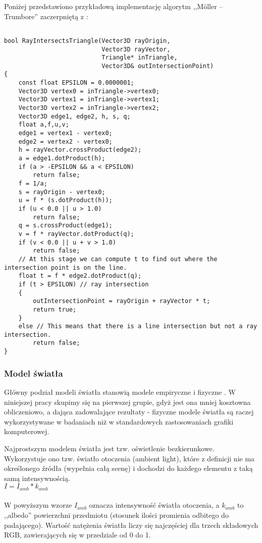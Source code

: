 Poniżej przedstawiono przykładową implementację algorytm ,,Möller – Trumbore'' zaczerpniętą z \cite{wikiMoll}:

\begin{lstlisting}

bool RayIntersectsTriangle(Vector3D rayOrigin, 
                           Vector3D rayVector, 
                           Triangle* inTriangle,
                           Vector3D& outIntersectionPoint)
{
    const float EPSILON = 0.0000001; 
    Vector3D vertex0 = inTriangle->vertex0;
    Vector3D vertex1 = inTriangle->vertex1;  
    Vector3D vertex2 = inTriangle->vertex2;
    Vector3D edge1, edge2, h, s, q;
    float a,f,u,v;
    edge1 = vertex1 - vertex0;
    edge2 = vertex2 - vertex0;
    h = rayVector.crossProduct(edge2);
    a = edge1.dotProduct(h);
    if (a > -EPSILON && a < EPSILON)
        return false;
    f = 1/a;
    s = rayOrigin - vertex0;
    u = f * (s.dotProduct(h));
    if (u < 0.0 || u > 1.0)
        return false;
    q = s.crossProduct(edge1);
    v = f * rayVector.dotProduct(q);
    if (v < 0.0 || u + v > 1.0)
        return false;
    // At this stage we can compute t to find out where the intersection point is on the line.
    float t = f * edge2.dotProduct(q);
    if (t > EPSILON) // ray intersection
    {
        outIntersectionPoint = rayOrigin + rayVector * t; 
        return true;
    }
    else // This means that there is a line intersection but not a ray intersection.
        return false;
}

\end{lstlisting}

\subsubsection{Model światła}

Główny podział modeli światła stanowią modele empiryczne i fizyczne \cite{suffern2007, falski2004}. W niniejszej pracy skupimy się na pierwszej grupie, gdyż jest ona mniej kosztowna obliczeniowo, a dająca zadowalające rezultaty - fizyczne modele światła są raczej wykorzystywane w badaniach niż w standardowych zastosowaniach grafiki komputerowej.


Najprostszym modelem światła jest tzw. oświetlenie bezkierunkowe. Wykorzystuje ono tzw. światło otoczenia (ambient light), które z definicji nie ma określonego źródła (wypełnia całą scenę) i dochodzi do każdego elementu z taką samą intensywnością.
\\
$I = I_{amb} * k_{amb}$\\
\\
W powyższym wzorze $I_{amb}$ oznacza intensywność światła otoczenia, a $k_{amb}$ to ,,albedo'' powierzchni przedmiotu (stosunek ilości promienia odbitego do padającego). Wartość natężenia światła liczy się najczęściej dla trzech składowych RGB, zawierających się w przedziale od 0 do 1.


